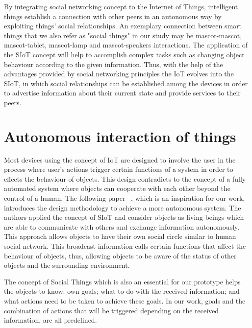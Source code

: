 By integrating social networking concept to the Internet of Things, intelligent things
establish a connection with other peers in an autonomous way by exploiting things' social relationships.
An exemplary connection between smart things that we also refer as "social things" in our
study may be mascot-mascot, mascot-tablet, mascot-lamp and mascot-speakers interactions.
The application of the SIoT concept will help to accomplish complex tasks such as changing
object behaviour according to the given information.
Thus, with the help of the advantages provided by social networking principles
the IoT evolves into the SIoT, in which social relationships can be established among
the devices in order to advertise information about their current state and provide services to their peers.

\section{Autonomous interaction of things}
\label{sec:Autonomous interaction of things}
Most devices using the concept of IoT are designed to involve the user in the process
where user's actions trigger certain functions of a system in order to effects the behaviour of objects.
This design contradicts to the concept of a fully automated system where objects
can cooperate with each other beyond the control of a human.
The following paper ~\cite{okada2016autonomous}, which is an inspiration for our work,
introduces the design methodology to achieve a more autonomous system.
The authors applied the concept of SIoT and consider objects as living beings which are
able to communicate with others and exchange information autonomously.
This approach allows objects to have their own social circle similar to human social network.
This broadcast information calls certain functions that affect the behaviour of objects,
thus, allowing objects to be aware of the status of other objects and the surrounding environment.

The concept of Social Things which is also an essential for our prototype helps the objects to know: own goals;
what to do with the received information;
and what actions need to be taken to achieve these goals.
In our work, goals and the combination of actions that will be triggered
depending on the received information, are all predefined.

